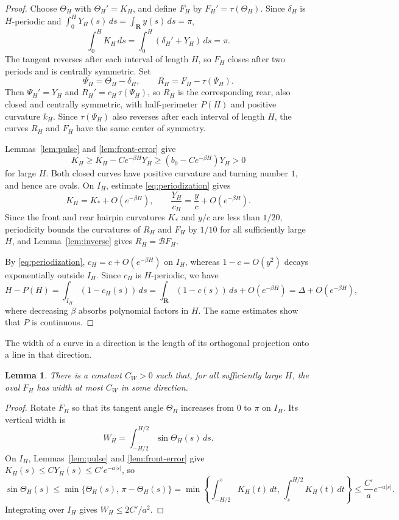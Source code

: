 \documentclass[11pt]{article}
\numberwithin{equation}{section}
\newtheorem{lemma}[theorem]{Lemma}
\newcommand{\R}{\mathbf{R}}
\newcommand{\Bmap}{\mathcal B}
\newcommand{\abs}[1]{\lvert #1\rvert}
\begin{document}
\begin{proof}
Choose \(\Theta_H\) with \(\Theta_H'=K_H\), and define \(F_H\) by
\(F_H'=\tau(\Theta_H)\). Since
\(\delta_H\) is \(H\)-periodic and \(\int_0^H Y_H(s)\,ds=\int_\R y(s)\,ds=\pi\),
\[
  \int_0^H K_H\,ds=\int_0^H(\delta_H'+Y_H)\,ds=\pi.
\]
The tangent reverses after each interval of length \(H\), so \(F_H\)
closes after two periods and is centrally symmetric. Set
\[
  \Psi_H=\Theta_H-\delta_H,\qquad R_H=F_H-\tau(\Psi_H).
\]
Then \(\Psi_H'=Y_H\) and \(R_H'=c_H\,\tau(\Psi_H)\), so \(R_H\) is the
corresponding rear, also closed and centrally symmetric, with half-perimeter
\(P(H)\) and positive curvature \(k_H\). Since \(\tau(\Psi_H)\) also reverses
after each interval of length \(H\), the curves \(R_H\) and \(F_H\) have the
same center of symmetry.

Lemmas~\ref{lem:pulse} and \ref{lem:front-error} give
\[
  K_H\geq\overline K_H-Ce^{-\beta H}Y_H
       \geq(b_0-Ce^{-\beta H})Y_H>0
\]
for large \(H\). Both closed curves have positive curvature and turning
number \(1\), and hence are ovals. On \(I_H\), estimate
\eqref{eq:periodization} gives
\[
  K_H=K_*+O(e^{-\beta H}),\qquad
  \frac{Y_H}{c_H}=\frac yc+O(e^{-\beta H}).
\]
Since the front and rear hairpin curvatures \(K_*\) and \(y/c\) are less than
\(1/20\), periodicity bounds the curvatures of \(R_H\) and \(F_H\) by \(1/10\)
for all sufficiently large \(H\), and Lemma~\ref{lem:inverse} gives
\(R_H=\Bmap F_H\).

By \eqref{eq:periodization}, \(c_H=c+O(e^{-\beta H})\) on \(I_H\), whereas
\(1-c=O(y^2)\) decays exponentially outside \(I_H\). Since \(c_H\) is
\(H\)-periodic, we have
\[
  H-P(H)=\int_{I_H}(1-c_H(s))\,ds
        =\int_\R(1-c(s))\,ds+O(e^{-\beta H})
        =\Delta+O(e^{-\beta H}),
\]
where decreasing \(\beta\) absorbs polynomial factors in \(H\). The same
estimates show that \(P\) is continuous.
\end{proof}

The width of a curve in a direction is the length of its orthogonal
projection onto a line in that direction.

\begin{lemma}\label{lem:width}
There is a constant \(C_W>0\) such that, for all sufficiently large \(H\),
the oval \(F_H\) has width at most \(C_W\) in some direction.
\end{lemma}

\begin{proof}
Rotate \(F_H\) so that its tangent angle \(\Theta_H\) increases from \(0\) to
\(\pi\) on \(I_H\). Its vertical width is
\[
  W_H=\int_{-H/2}^{H/2}\sin\Theta_H(s)\,ds.
\]
On \(I_H\), Lemmas~\ref{lem:pulse} and \ref{lem:front-error} give
\(K_H(s)\leq CY_H(s)\leq C'e^{-a\abs s}\), so
\[
  \sin\Theta_H(s)\leq\min\bigl\{\Theta_H(s),\,\pi-\Theta_H(s)\bigr\}
  =\min\left\{\int_{-H/2}^s K_H(t)\,dt,\,\int_s^{H/2} K_H(t)\,dt\right\}
  \leq\frac{C'}a e^{-a\abs s}.
\]
Integrating over \(I_H\) gives \(W_H\leq 2C'/a^2\).
\end{proof}
\end{document}

